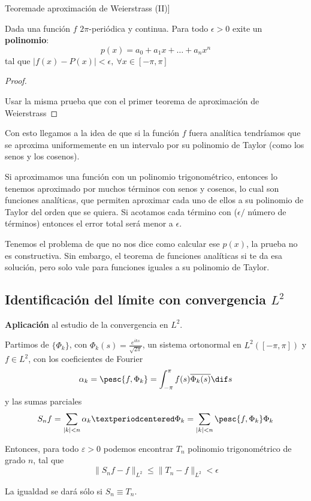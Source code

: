 		\begin{theorem}Teorema\IS de aproximación de Weierstrass (II)] \label{thm:AproxWeierstrass2}
		$ $ %

		\noindent Dada una función $f$ $2\pi$-periódica y continua. Para todo $\epsilon > 0$ exite un {\bf polinomio}:
		$$p(x)= a_0 + a_1 x + … + a_n x^n$$ tal que $|f(x)-P(x)| < \epsilon, \ \forall x \in [-\pi,\pi]$
		\end{theorem}

		\begin{proof}
		$ $ %

		\noindent Usar la misma prueba que con el primer teorema de aproximación de Weierstrass
		\end{proof}

		Con esto llegamos a la idea de que si la función $f$ fuera analítica tendríamos que se aproxima uniformemente en un intervalo por su polinomio de Taylor (como los senos y los cosenos).

		Si aproximamos una función con un polinomio trigonométrico, entonces lo tenemos aproximado por muchos términos con senos y cosenos, lo cual son funciones analíticas, que permiten aproximar cada uno de ellos a su polinomio de Taylor del orden que se quiera. Si acotamos cada término con ($\epsilon / $ número de términos) entonces el error total será menor a $\epsilon$.

		Tenemos el problema de que no nos dice como calcular ese $p(x)$, la prueba no es constructiva. Sin embargo, el teorema de funciones analíticas si te da esa solución, pero solo vale para funciones iguales a su polinomio de Taylor.

		\clearpage %
		\subsection{Identificación del límite con convergencia $L^2$}
		\textbf{Aplicación} al estudio de la convergencia en $L^2$.

		\begin{theorem} \label{thm:ConvergenciaL2}
			Partimos de $\{\Phi_k\}$, con $\Phi_k(s) = \frac{e^{iks}}{\sqrt{2\pi}}$, un sistema ortonormal en $L^2([-\pi,\pi])$ y $f \in L^2$, con los coeficientes de Fourier
			\[\alpha_k = \pesc{f, \Phi_{k}} = \int_{-\pi}^\pi f(s) \overline{\Phi_k(s)} \dif s  \] y las sumas parciales
			\[  S_n f = \sum_{|k| < n} \alpha_k · \Phi_k = \sum_{|k| < n}\pesc{f, \Phi_k} \Phi_k \]

			Entonces, para todo $ε > 0$ podemos encontrar $T_n$ polinomio trigonométrico de grado $n$, tal que
			\[ \| S_n f - f\|_{L^2} \leq \| T_n - f \|_{L^2} < \epsilon \]

			La igualdad se dará sólo si $S_n \equiv T_n$.

		\end{theorem}

